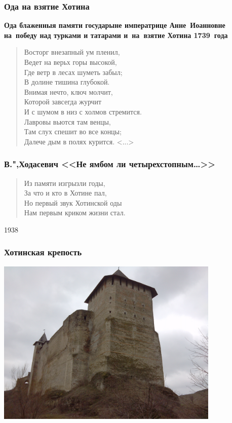 \documentclass{beamer}
\begin{document}


\begin{frame}
\frametitle{Ода на взятие Хотина}
\begin{center}
\textbf{Ода блаженныя памяти государыне императрице Анне~Иоанновне на~победу над турками и татарами и~на~взятие Хотина 1739~года}
\end{center}

\begin{verse}
Восторг внезапный ум пленил,\\
Ведет на верьх горы высокой,\\
Где ветр в лесах шуметь забыл;\\
В долине тишина глубокой.\\
Внимая нечто, ключ молчит,\\
Которой завсегда журчит\\
И с шумом в низ с холмов стремится.\\
Лавровы вьются там венцы,\\
Там слух спешит во все концы;\\
Далече дым в полях курится. <...>
\end{verse}
\end{frame}


\begin{frame}
\frametitle{В.",Ходасевич <<Не ямбом ли четырехстопным\dots>>}

\begin{verse}
Из памяти изгрызли годы,\\
За что и кто в Хотине пал,\\
Но первый звук Хотинской оды\\
Нам первым криком жизни стал.
\end{verse}

1938
\end{frame}


\begin{frame}
\frametitle{Хотинская крепость}
\begin{center}
\includegraphics[width=0.8\textwidth]{Xotin.jpg}
\end{center}

\end{frame}
\end{document}
